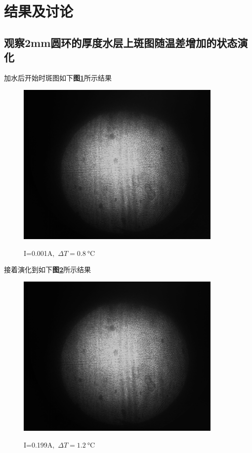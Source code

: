 \documentclass[a4paper]{article}
\begin{document}
\newpage
\section{结果及讨论}
\subsection{观察2mm圆环的厚度水层上斑图随温差增加的状态演化}\label{sub:1}
加水后开始时斑图如下\textbf{图\ref{result:fig1}}所示结果 
\begin{figure}[H]
 \centering
 \caption{I=0.001A,\ $\Delta T=\SI{0.8}{\celsius}$}
 \includegraphics[height=8cm, width=10cm]{images/25.3_26.1_0.001_3.19.bmp}
 \label{result:fig1}
\end{figure}
接着演化到如下\textbf{图\ref{result:fig2}}所示结果 
\begin{figure}[H]
 \centering
 \caption{I=0.199A,\ $\Delta T=\SI{1.2}{\celsius}$}
 \includegraphics[height=8cm, width=10cm]{images/25.5_26.7_0.199_3.30.bmp}
 \label{result:fig2}
\end{figure}
\end{document}
